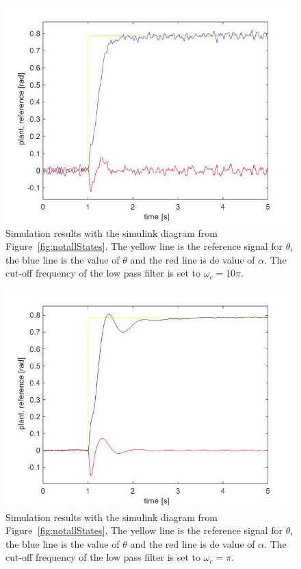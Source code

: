 \documentclass[ twoside,openright,titlepage,numbers=noenddot,headinclude,%
                footinclude=true,cleardoublepage=empty,abstractoff, %
                BCOR=5mm,paper=a4,fontsize=11pt,%
                ngerman,american,%
                ]{scrreprt}
\begin{document}
{\begin{figure}
\includegraphics[scale=0.5]{images/sim_results2}
\caption{Simulation results with the simulink diagram from Figure~\ref{fig:notallStates}. The yellow line is the reference signal for $\theta$, the blue line is the value of $\theta$ and the red line is de value of $\alpha$. The cut-off frequency of the low pass filter is set to $\omega_c = 10\pi$. }
\label{fig:sim_results2}
\end{figure}

\begin{figure}
\includegraphics[scale=0.5]{images/sim_results3}
\caption{Simulation results with the simulink diagram from Figure~\ref{fig:notallStates}. The yellow line is the reference signal for $\theta$, the blue line is the value of $\theta$ and the red line is de value of $\alpha$. The cut-off frequency of the low pass filter is set to $\omega_c = \pi$. }
\label{fig:sim_results3}
\end{figure}



}
\end{document}
